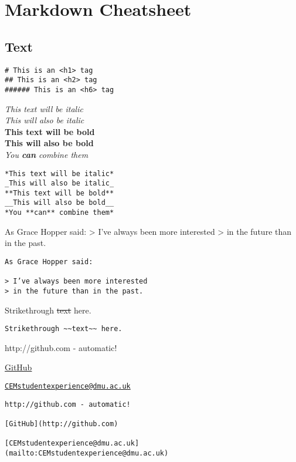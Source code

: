 \documentclass[
]{article}
\date{}
\begin{document}
\hypertarget{markdown-cheatsheet}{%
\section{Markdown Cheatsheet}\label{markdown-cheatsheet}}

\hypertarget{text}{%
\subsection{Text}\label{text}}

\begin{verbatim}
# This is an <h1> tag
## This is an <h2> tag
###### This is an <h6> tag
\end{verbatim}

\emph{This text will be italic}\\
\emph{This will also be italic}\\
\textbf{This text will be bold}\\
\textbf{This will also be bold}\\
\emph{You \textbf{can} combine them}

\begin{verbatim}
*This text will be italic*  
_This will also be italic_  
**This text will be bold**  
__This will also be bold__  
*You **can** combine them*
\end{verbatim}

As Grace Hopper said: \textgreater{} I've always been more interested
\textgreater{} in the future than in the past.

\begin{verbatim}
As Grace Hopper said:  

> I’ve always been more interested
> in the future than in the past.
\end{verbatim}

Strikethrough \sout{text} here.

\begin{verbatim}
Strikethrough ~~text~~ here.
\end{verbatim}

http://github.com - automatic!

\href{http://github.com}{GitHub}

\href{mailto:CEMstudentexperience@dmu.ac.uk}{\nolinkurl{CEMstudentexperience@dmu.ac.uk}}

\begin{verbatim}
http://github.com - automatic!

[GitHub](http://github.com)

[CEMstudentexperience@dmu.ac.uk](mailto:CEMstudentexperience@dmu.ac.uk)
\end{verbatim}
\end{document}
